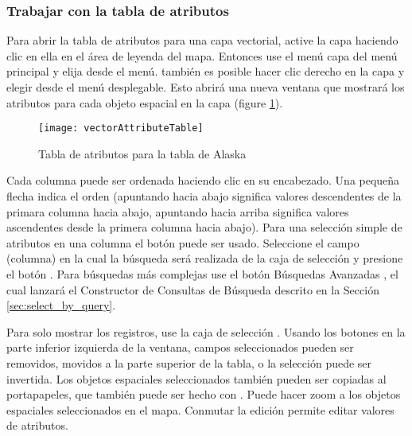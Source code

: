 \subsubsection{Trabajar con la tabla de atributos}\label{sec:attribute table}

Para abrir la tabla de atributos para una capa vectorial, active la capa haciendo clic en ella en el \'area de leyenda del mapa. 
Entonces use el men\'u  capa del men\'u principal y elija  
desde el men\'u. también es posible hacer clic derecho en la capa y elegir  
desde el men\'u desplegable. Esto abrir\'a una nueva ventana que mostrar\'a los atributos para cada objeto espacial en la capa 
(figure \ref{fig:attributetable}).

\begin{figure}[ht]
   \begin{center}
   \caption{Tabla de atributos para la tabla de Alaska \nixcaption}\label{fig:attributetable}\smallskip
   \texttt{[image: vectorAttributeTable]}
\end{center} 
\end{figure}

Cada columna puede ser ordenada haciendo clic en su encabezado. Una peque\~na flecha indica el orden 
(apuntando hacia abajo significa valores descendentes de la primara columna hacia abajo, apuntando hacia arriba significa valores ascendentes desde la primera columna hacia abajo). 
Para una selecci\'on simple de atributos en una columna el bot\'on  
puede ser usado. Seleccione el campo (columna) en la cual la b\'usqueda ser\'a realizada 
de la caja de selecci\'on y presione el bot\'on . Para b\'usquedas más complejas use
el bot\'on B\'usquedas Avanzadas , el cual lanzar\'a el Constructor de Consultas de B\'usqueda descrito en 
la Secci\'on \ref{sec:select_by_query}. 

Para solo mostrar los registros, use la caja de selecci\'on .
Usando los botones en la parte inferior izquierda  de la ventana, campos seleccionados pueden ser removidos, 
movidos a la parte superior de la tabla, o la selecci\'on puede ser invertida. Los objetos espaciales seleccionados también pueden ser
copiadas al portapapeles, que también puede ser hecho con . Puede hacer zoom 
a los objetos espaciales seleccionados en el mapa. Conmutar la edici\'on permite editar valores de atributos. 

